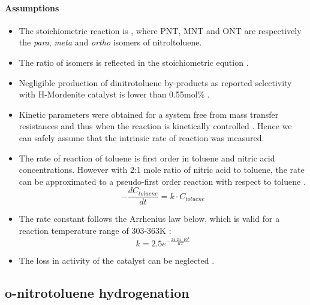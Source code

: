 \paragraph{Assumptions}
\begin{itemize}
    \item The stoichiometric reaction is , where PNT, MNT and ONT are respectively the \textit{para}, \textit{meta} and \textit{ortho} isomers of nitroltoluene.
    \item The ratio of isomers is reflected in the stoichiometric eqution \cite{smith_novel_1998}.
    \item Negligible production of dinitrotoluene by-products as reported selectivity with H-Mordenite catalyst is lower than 0.55mol\% \cite{jeeru_kinetics_2018}.
    \item Kinetic parameters were obtained for a system free from mass transfer resistances and thus when the reaction is kinetically controlled \cite{jeeru_kinetics_2018}. Hence we can safely assume that the intrinsic rate of reaction was measured.
    \item The rate of reaction of toluene is first order in toluene and nitric acid concentrations. However with 2:1 mole ratio of nitric acid to toluene, the rate can be approximated to a pseudo-first order reaction with respect to toluene \cite{jeeru_kinetics_2018}.
    \begin{equation}
    - \frac{dC_{toluene}}{dt}=k \cdot C_{toluene} 
    \end{equation}
    \item The rate constant follows the Arrhenius law below, which is valid for a reaction temperature range of 303-363K \cite{jeeru_kinetics_2018}:
    \begin{equation}
        k=2.5e^{-\frac{24.24\cdot 10^{3}}{RT}}
    \end{equation}
    \item The loss in activity of the catalyst can be neglected \cite{jeeru_kinetics_2018}.
\end{itemize}

\subsection{o-nitrotoluene hydrogenation}
